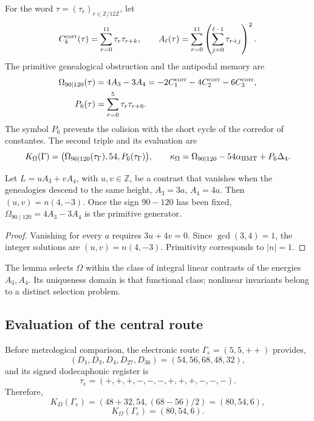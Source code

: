 For the word \(\tau=(\tau_r)_{r\in\mathbb Z/12\mathbb Z}\), let
\[
 C_k^{\rm corr}(\tau)=\sum_{r=0}^{11}\tau_r\tau_{r+k},
 \qquad
 A_\ell(\tau)=\sum_{r=0}^{11}
 \left(\sum_{j=0}^{\ell-1}\tau_{r+j}\right)^2.
\]
The primitive genealogical obstruction and the antipodal memory are
\begin{align}
 \Omega_{90\mid120}(\tau)
 &=4A_3-3A_4
 =-2C_1^{\rm corr}-4C_2^{\rm corr}-6C_3^{\rm corr},
 \label{eq:omega-two-way-rev11}\\
 P_6(\tau)&=\sum_{r=0}^{5}\tau_r\tau_{r+6}.
 \label{eq:p6-two-way-rev11}
\end{align}
The symbol \(P_6\) prevents the colision with the short cycle of the corredor of
constantes. The second triple and its evaluation are
\begin{equation}
 K_\Omega(\Gamma)=\bigl(\Omega_{90\mid120}(\tau_\Gamma),54,
 P_6(\tau_\Gamma)\bigr),
 \qquad
 \kappa_\Omega=\Omega_{90\mid120}-54\alpha_{\rm HMT}+P_6\Delta_4.
 \label{eq:kappa-omega-rev11}
\end{equation}

\begin{lemma}
\label{lem:unicidad-omega-rev11}
Let \(L=uA_3+vA_4\), with \(u,v\in\mathbb Z\), be a contrast that vanishes
when the genealogies descend to the same height,
\(A_3=3a\), \(A_4=4a\). Then
\((u,v)=n(4,-3)\). Once the sign \(90-120\) has been fixed,
\(\Omega_{90\mid120}=4A_3-3A_4\) is the primitive generator.
\end{lemma}

\begin{proof}
Vanishing for every \(a\) requires \(3u+4v=0\). Since
\(\gcd(3,4)=1\), the integer solutions are
\((u,v)=n(4,-3)\). Primitivity corresponds to \(|n|=1\).
\end{proof}

The lemma selects \(\Omega\) within the class of integral linear contrasts
of the energies \(A_3,A_4\). Its uniqueness domain is that functional
class; nonlinear invariants belong to a distinct selection problem.

\subsection{Evaluation of the central route}

Before metrological comparison, the electronic route \(\Gamma_e=(5,5,++)\) provides,
\[
 (D_1,D_3,D_4,D_{27},D_{36})=(54,56,68,48,32),
\]
and its signed dodecaphonic register is
\[
 \tau_e=(+,+,+,-,-,-,+,+,+,-,-,-).
\]
Therefore,
\[
 K_D(\Gamma_e)=(48+32,54,(68-56)/2)=(80,54,6),
\]
\[
 K_\Omega(\Gamma_e)=(80,54,6).
\]

